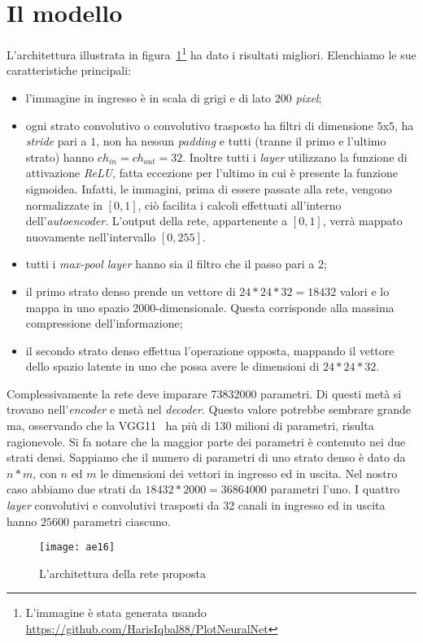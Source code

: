 \section{Il modello}
L'architettura illustrata in figura~\ref{fig:ae16_arch}\footnote{L'immagine è stata generata usando \url{https://github.com/HarisIqbal88/PlotNeuralNet}} ha dato i risultati migliori. %
Elenchiamo le sue caratteristiche principali:
\begin{itemize}
  \item l'immagine in ingresso è in scala di grigi e di lato $200$ \textit{pixel};

  \item ogni strato convolutivo o convolutivo trasposto ha filtri di dimensione $5$x$5$, ha \textit{stride} pari a $1$, non ha nessun \textit{padding} e tutti (tranne il primo e l'ultimo strato) hanno $ch_{in}=ch_{out}=32$.
    Inoltre tutti i \textit{layer} utilizzano la funzione di attivazione \textit{ReLU}, fatta eccezione per l'ultimo in cui è presente la funzione sigmoidea.
    Infatti, le immagini, prima di essere passate alla rete, vengono normalizzate in $[0,1]$, ciò facilita i calcoli effettuati all'interno dell'\textit{autoencoder}.
    L'output della rete, appartenente a $[0,1]$, verrà mappato nuovamente nell'intervallo $[0,255]$.

  \item tutti i \textit{max-pool layer} hanno sia il filtro che il passo pari a 2;

  \item il primo strato denso prende un vettore di $24*24*32=18432$ valori e lo mappa in uno spazio $2000$-dimensionale.
    Questa corrisponde alla massima compressione dell'informazione;

  \item il secondo strato denso effettua l'operazione opposta, mappando il vettore dello spazio latente in uno che possa avere le dimensioni di $24*24*32$.

\end{itemize}
Complessivamente la rete deve imparare  $73 832 000$ parametri.
Di questi metà si trovano nell'\textit{encoder} e metà nel \textit{decoder}.
Questo valore potrebbe sembrare grande ma, osservando che la VGG11~\cite{vgg} ha più di 130 milioni di parametri, risulta ragionevole.
Si fa notare che la maggior parte dei parametri è contenuto nei due strati densi.
Sappiamo che il numero di parametri di uno strato denso è dato da $n * m$, con $n$ ed $m$ le dimensioni dei vettori in ingresso ed in uscita.
Nel nostro caso abbiamo due strati da $18432 * 2000 = 36 864 000$ parametri l'uno.
I quattro \textit{layer} convolutivi e convolutivi trasposti da 32 canali in ingresso ed in uscita hanno $25600$ parametri ciascuno.

\begin{figure}[ht]
  \begin{center}
    \texttt{[image: ae16]}
    \caption{L'architettura della rete proposta}
    \label{fig:ae16_arch}
  \end{center}
\end{figure}

